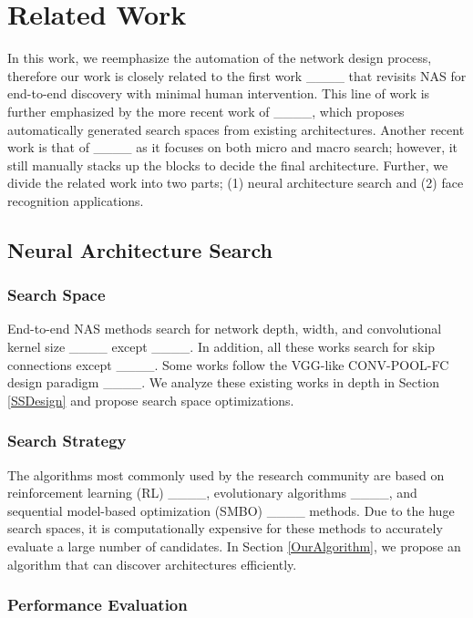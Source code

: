 \section{Related Work}
In this work, we reemphasize the automation of the network design process, therefore our work is closely related to the first work ____ that revisits NAS for end-to-end discovery with minimal human intervention. This line of work is further emphasized by the more recent work of ____, which proposes automatically generated search spaces from existing architectures. Another recent work is that of ____ as it focuses on both micro and macro search; however, it still manually stacks up the blocks to decide the final architecture. Further, we divide the related work into two parts; (1) neural architecture search and (2) face recognition applications.
 

\subsection{Neural Architecture Search}


\subsubsection{Search Space} End-to-end NAS methods search for network depth, width, and convolutional kernel size ____ except ____. In addition, all these works search for skip connections except ____. Some works follow the VGG-like CONV-POOL-FC design paradigm ____. We analyze these existing works in depth in Section \ref{SSDesign} and propose search space optimizations.

 
\subsubsection{Search Strategy}

The algorithms most commonly used by the research community are based on reinforcement learning (RL) ____, evolutionary algorithms ____, and sequential model-based optimization (SMBO) ____ methods. Due to the huge search spaces, it is computationally expensive for these methods to accurately evaluate a large number of candidates. In Section \ref{OurAlgorithm}, we propose an algorithm that can discover architectures efficiently.

\subsubsection{Performance Evaluation}


